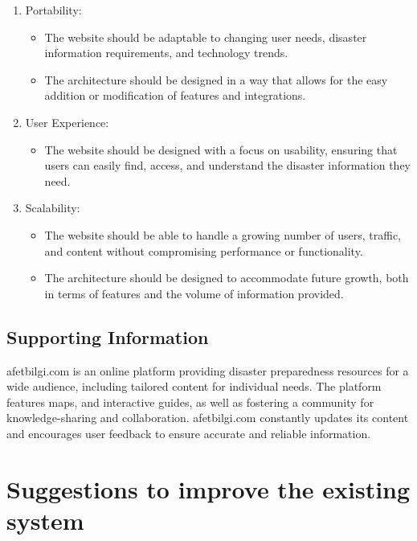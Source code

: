 \documentclass[11pt,a4paper]{article}
\begin{document}
\begin{enumerate}
\newpage

\item Portability:
\begin{itemize}
    \item The website should be adaptable to changing user needs, disaster information requirements, and technology trends.
    \item The architecture should be designed in a way that allows for the easy addition or modification of features and integrations.
\end{itemize}

\item User Experience:
\begin{itemize}
    \item The website should be designed with a focus on usability, ensuring that users can easily find, access, and understand the disaster information they need.
\end{itemize}

\item Scalability:
\begin{itemize}
    \item The website should be able to handle a growing number of users, traffic, and content without compromising performance or functionality.
    \item The architecture should be designed to accommodate future growth, both in terms of features and the volume of information provided.
\end{itemize}

\end{enumerate}

\subsection{Supporting Information}
afetbilgi.com is an online platform providing disaster preparedness resources for a wide audience, including tailored content for individual needs. The platform features maps, and interactive guides, as well as fostering a community for knowledge-sharing and collaboration. afetbilgi.com constantly updates its content and encourages user feedback to ensure accurate and reliable information.

\newpage


\section{Suggestions to improve the existing system}
\end{document}
